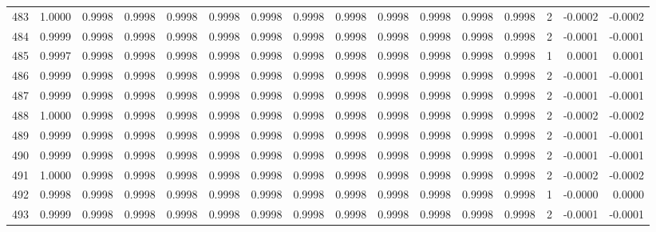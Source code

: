 \begin{tabular}{lrrrrrrrrrrrrrrr}
483 &      1.0000 &  0.9998 &  0.9998 &  0.9998 &  0.9998 &  0.9998 &  0.9998 &  0.9998 &  0.9998 &  0.9998 &   0.9998 &     0.9998 &      2 &                   -0.0002 &                    -0.0002 \\
484 &      0.9999 &  0.9998 &  0.9998 &  0.9998 &  0.9998 &  0.9998 &  0.9998 &  0.9998 &  0.9998 &  0.9998 &   0.9998 &     0.9998 &      2 &                   -0.0001 &                    -0.0001 \\
485 &      0.9997 &  0.9998 &  0.9998 &  0.9998 &  0.9998 &  0.9998 &  0.9998 &  0.9998 &  0.9998 &  0.9998 &   0.9998 &     0.9998 &      1 &                    0.0001 &                     0.0001 \\
486 &      0.9999 &  0.9998 &  0.9998 &  0.9998 &  0.9998 &  0.9998 &  0.9998 &  0.9998 &  0.9998 &  0.9998 &   0.9998 &     0.9998 &      2 &                   -0.0001 &                    -0.0001 \\
487 &      0.9999 &  0.9998 &  0.9998 &  0.9998 &  0.9998 &  0.9998 &  0.9998 &  0.9998 &  0.9998 &  0.9998 &   0.9998 &     0.9998 &      2 &                   -0.0001 &                    -0.0001 \\
488 &      1.0000 &  0.9998 &  0.9998 &  0.9998 &  0.9998 &  0.9998 &  0.9998 &  0.9998 &  0.9998 &  0.9998 &   0.9998 &     0.9998 &      2 &                   -0.0002 &                    -0.0002 \\
489 &      0.9999 &  0.9998 &  0.9998 &  0.9998 &  0.9998 &  0.9998 &  0.9998 &  0.9998 &  0.9998 &  0.9998 &   0.9998 &     0.9998 &      2 &                   -0.0001 &                    -0.0001 \\
490 &      0.9999 &  0.9998 &  0.9998 &  0.9998 &  0.9998 &  0.9998 &  0.9998 &  0.9998 &  0.9998 &  0.9998 &   0.9998 &     0.9998 &      2 &                   -0.0001 &                    -0.0001 \\
491 &      1.0000 &  0.9998 &  0.9998 &  0.9998 &  0.9998 &  0.9998 &  0.9998 &  0.9998 &  0.9998 &  0.9998 &   0.9998 &     0.9998 &      2 &                   -0.0002 &                    -0.0002 \\
492 &      0.9998 &  0.9998 &  0.9998 &  0.9998 &  0.9998 &  0.9998 &  0.9998 &  0.9998 &  0.9998 &  0.9998 &   0.9998 &     0.9998 &      1 &                   -0.0000 &                     0.0000 \\
493 &      0.9999 &  0.9998 &  0.9998 &  0.9998 &  0.9998 &  0.9998 &  0.9998 &  0.9998 &  0.9998 &  0.9998 &   0.9998 &     0.9998 &      2 &                   -0.0001 &                    -0.0001 \\

\end{tabular}
